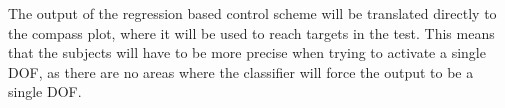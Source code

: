 The output of the regression based control scheme will be translated directly to the compass plot, where it will be used to reach targets in the test. This means that the subjects will have to be more precise when trying to activate a single DOF, as there are no areas where the classifier will force the output to be a single DOF.